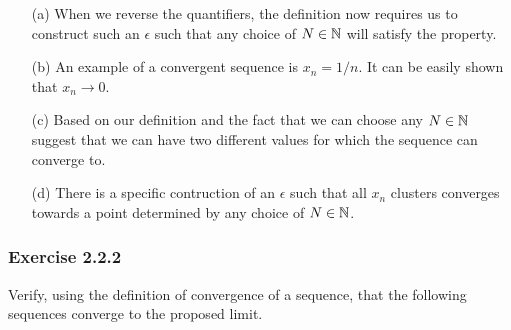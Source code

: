\begin{enumerate}
    \item [(a)] When we reverse the quantifiers, the definition now requires us to construct such an \( \epsilon  \) such that any choice of \( N \in \mathbb{N} \) will satisfy the property. 
    \item [(b)] An example of a convergent sequence is \( x_n = 1/n \). It can be easily shown that \( x_n \to 0 \).  
    \item [(c)] Based on our definition and the fact that we can choose any \( N \in \mathbb{N} \) suggest that we can have two different values for which the sequence can converge to.
    \item [(d)] There is a specific contruction of an \( \epsilon\) such that all \( x_n \) clusters converges towards a point determined by any choice of \( N \in \mathbb{N} \). 
\end{enumerate}

\subsubsection{Exercise 2.2.2}
Verify, using the definition of convergence of a sequence, that the following sequences converge to the 
proposed limit. 

